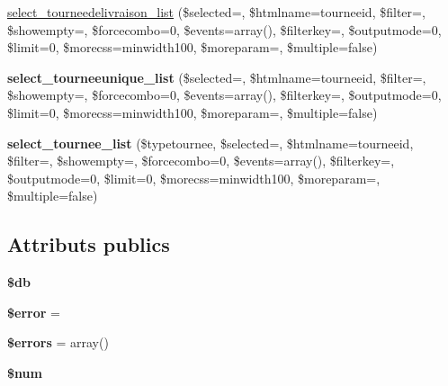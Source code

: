 \begin{DoxyCompactItemize}
\item 
\hyperlink{classFormTourneesDeLivraison_a550752fa41299b742586167a2f74d145}{select\+\_\+tourneedelivraison\+\_\+list} (\$selected=\textquotesingle{}\textquotesingle{}, \$htmlname=\textquotesingle{}tourneeid\textquotesingle{}, \$filter=\textquotesingle{}\textquotesingle{}, \$showempty=\textquotesingle{}\textquotesingle{}, \$forcecombo=0, \$events=array(), \$filterkey=\textquotesingle{}\textquotesingle{}, \$outputmode=0, \$limit=0, \$morecss=\textquotesingle{}minwidth100\textquotesingle{}, \$moreparam=\textquotesingle{}\textquotesingle{}, \$multiple=false)
\item 
\mbox{\label{classFormTourneesDeLivraison_a1065d4d1efe58422e4862f0717d8ed96}} 
{\bfseries select\+\_\+tourneeunique\+\_\+list} (\$selected=\textquotesingle{}\textquotesingle{}, \$htmlname=\textquotesingle{}tourneeid\textquotesingle{}, \$filter=\textquotesingle{}\textquotesingle{}, \$showempty=\textquotesingle{}\textquotesingle{}, \$forcecombo=0, \$events=array(), \$filterkey=\textquotesingle{}\textquotesingle{}, \$outputmode=0, \$limit=0, \$morecss=\textquotesingle{}minwidth100\textquotesingle{}, \$moreparam=\textquotesingle{}\textquotesingle{}, \$multiple=false)
\item 
\mbox{\label{classFormTourneesDeLivraison_a843f230df70875ed2667a406cbbcf49b}} 
{\bfseries select\+\_\+tournee\+\_\+list} (\$typetournee, \$selected=\textquotesingle{}\textquotesingle{}, \$htmlname=\textquotesingle{}tourneeid\textquotesingle{}, \$filter=\textquotesingle{}\textquotesingle{}, \$showempty=\textquotesingle{}\textquotesingle{}, \$forcecombo=0, \$events=array(), \$filterkey=\textquotesingle{}\textquotesingle{}, \$outputmode=0, \$limit=0, \$morecss=\textquotesingle{}minwidth100\textquotesingle{}, \$moreparam=\textquotesingle{}\textquotesingle{}, \$multiple=false)
\end{DoxyCompactItemize}
\subsection*{Attributs publics}
\begin{DoxyCompactItemize}
\item 
\mbox{\label{classFormTourneesDeLivraison_ae78277b2e5865919b0cce07e7e4c334d}} 
{\bfseries \$db}
\item 
\mbox{\label{classFormTourneesDeLivraison_a58c20602a8cb76eb923b06f80928df96}} 
{\bfseries \$error} =\textquotesingle{}\textquotesingle{}
\item 
\mbox{\label{classFormTourneesDeLivraison_ad7b783952a40e8a2300d627d82280d1c}} 
{\bfseries \$errors} = array()
\item 
\mbox{\label{classFormTourneesDeLivraison_a33730d0ffa246d57dd4625f13b5b94d0}} 
{\bfseries \$num}
\end{DoxyCompactItemize}



